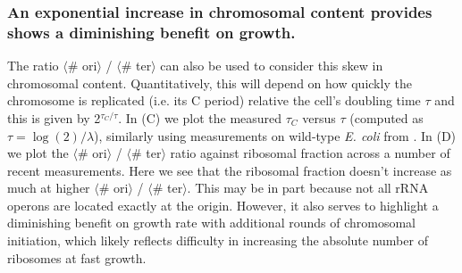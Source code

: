 \subsubsection{An exponential increase in chromosomal content provides shows
a diminishing benefit on growth.}

The ratio $\langle$\# ori$\rangle$ / $\langle$\# ter$\rangle$ can also be used
to consider this skew in chromosomal content. Quantitatively, this will depend
on how quickly the chromosome is replicated (i.e. its C period) relative the
cell's doubling time $\tau$ and this is given by 2$^{\tau_C / \tau}$. In
(C) we plot the measured $\tau_C$ versus $\tau$
(computed as $\tau = \log (2) / \lambda$), similarly using measurements on
wild-type \textit{E. coli} from  \citep{si2017}. In
(D) we plot the $\langle$\# ori$\rangle$ /
$\langle$\# ter$\rangle$ ratio against ribosomal fraction across a number of
recent measurements. Here we see that the ribosomal fraction doesn't increase as
much at higher $\langle$\# ori$\rangle$ / $\langle$\# ter$\rangle$. This may be
in part because not all rRNA operons are located exactly at the origin. However,
it also serves to highlight a diminishing  benefit on growth rate with
additional rounds of chromosomal initiation, which likely reflects  difficulty
in increasing the absolute number of ribosomes at fast growth.


